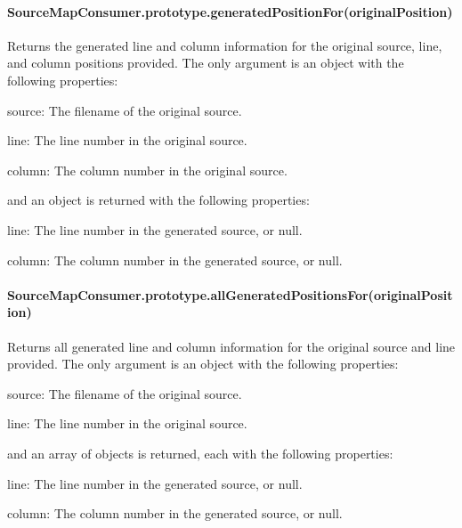 \paragraph*{Source\+Map\+Consumer.\+prototype.\+generated\+Position\+For(original\+Position)}

Returns the generated line and column information for the original source, line, and column positions provided. The only argument is an object with the following properties\+:


\begin{DoxyItemize}
\item {\ttfamily source}\+: The filename of the original source.
\item {\ttfamily line}\+: The line number in the original source.
\item {\ttfamily column}\+: The column number in the original source.
\end{DoxyItemize}

and an object is returned with the following properties\+:


\begin{DoxyItemize}
\item {\ttfamily line}\+: The line number in the generated source, or null.
\item {\ttfamily column}\+: The column number in the generated source, or null.
\end{DoxyItemize}

\paragraph*{Source\+Map\+Consumer.\+prototype.\+all\+Generated\+Positions\+For(original\+Position)}

Returns all generated line and column information for the original source and line provided. The only argument is an object with the following properties\+:


\begin{DoxyItemize}
\item {\ttfamily source}\+: The filename of the original source.
\item {\ttfamily line}\+: The line number in the original source.
\end{DoxyItemize}

and an array of objects is returned, each with the following properties\+:


\begin{DoxyItemize}
\item {\ttfamily line}\+: The line number in the generated source, or null.
\item {\ttfamily column}\+: The column number in the generated source, or null.
\end{DoxyItemize}

